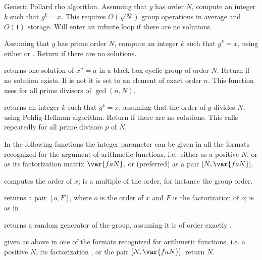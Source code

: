  \break
Generic Pollard rho algorithm. Assuming that $g$ has order $N$, compute an
integer $k$ such that $g^k = x$. This requires $O(\sqrt{N})$ group operations
in average and $O(1)$ storage. Will enter an infinite loop if there are no
solutions.

Assuming that $g$ has prime order $N$, compute an integer $k$ such that
$g^k = x$, using either  or .
Return  if there are no solutions.

  returns one solution of $x^n = a$ in a
black box cyclic group of order $N$. Return  if no solution exists.
If  is not  it is set to an element of exact order $n$.
This function uses  for all prime divisors of $\gcd(n,N)$.

returns an integer $k$ such that $g^k = x$, assuming that the order of $g$
divides $N$, using Pohlig-Hellman algorithm. Return  if
there are no solutions. This calls  repeatedly for all prime
divisors $p$ of $N$.

In the following functions the integer parameter  can be given
in all the formats recognized for the argument of arithmetic functions,
i.e.~either as a positive  $N$, or as its factorization matrix
$\var{faN}$, or (preferred) as a pair $[N,\var{faN}]$.

computes the order of $x$;  is a multiple of the order, for instance
the group order.

 returns a pair $[o,F]$, where $o$ is the order of $x$ and $F$ is the
factorization of $o$;  is as in .

returns a random generator of the group, assuming it is of order exactly
.

 given  as above in one of the
formats recognized for arithmetic functions, i.e. a positive
 $N$, its factorization , or the pair $[N, \var{faN}]$,
return $N$.

